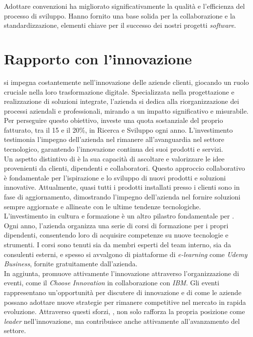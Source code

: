 Adottare convenzioni ha migliorato significativamente la qualità e l'efficienza del processo di sviluppo. Hanno fornito una base solida per la collaborazione e la standardizzazione, elementi chiave per il successo dei nostri progetti \textit{software}.
\newpage\section{Rapporto con l'innovazione}

\noindent{\azienda} si impegna costantemente nell'innovazione delle aziende clienti, giocando un ruolo cruciale nella loro trasformazione digitale. 
Specializzata nella progettazione e realizzazione di soluzioni integrate, l'azienda si dedica alla riorganizzazione dei processi aziendali e 
professionali, mirando a un impatto significativo e misurabile. \\
\noindent Per perseguire questo obiettivo, {\azienda} investe una quota sostanziale del proprio fatturato, tra il 15 e il 20\%, 
in Ricerca e Sviluppo ogni anno. L'investimento testimonia l'impegno dell'azienda nel rimanere all'avanguardia nel settore tecnologico, 
garantendo l'innovazione continua dei suoi prodotti e servizi. \\
\noindent Un aspetto distintivo di {\azienda} è la sua capacità di ascoltare e valorizzare le idee provenienti da clienti, dipendenti e collaboratori. 
Questo approccio collaborativo è fondamentale per l'ispirazione e lo sviluppo di nuovi prodotti e soluzioni innovative. Attualmente, quasi tutti i 
prodotti installati presso i clienti sono in fase di aggiornamento, dimostrando l'impegno dell'azienda nel fornire soluzioni sempre aggiornate e 
allineate con le ultime tendenze tecnologiche. \\
\noindent L'investimento in cultura e formazione è un altro pilastro fondamentale per {\azienda}. Ogni anno, l'azienda organizza una serie di corsi 
di formazione per i propri dipendenti, consentendo loro di acquisire competenze su nuove tecnologie e strumenti. 
I corsi sono tenuti sia da membri esperti del team interno, sia da consulenti esterni, e spesso si avvalgono di piattaforme 
di \textit{e-learning} come \textit{Udemy Business}, fornite gratuitamente dall'azienda. \\
\noindent In aggiunta, {\azienda} promuove attivamente l'innovazione attraverso l'organizzazione di eventi, 
come il \textit{Choose Innovation} in collaborazione con \textit{IBM}. Gli eventi rappresentano un'opportunità per discutere di 
innovazione e di come le aziende possano adottare nuove strategie per rimanere competitive nel mercato in rapida evoluzione. 
Attraverso questi sforzi, {\azienda}, non solo rafforza la propria posizione come \textit{leader} nell'innovazione, ma contribuisce anche 
attivamente all'avanzamento del settore. \\